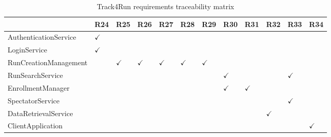 \begin{table}
\begin{adjustwidth}{-4cm}{}
\captionsetup{justification=centering}
\caption{Track4Run requirements traceability matrix}
  \label{tab:table3}
\begin{tabular}{|l||l|l|l|l|l|l|l|l|l|l|l|}
\hline
\cellcolor[HTML]{EFEFEF}                      & \cellcolor[HTML]{EFEFEF} R24 & \cellcolor[HTML]{EFEFEF} R25 & \cellcolor[HTML]{EFEFEF} R26 & \cellcolor[HTML]{EFEFEF} R27 & \cellcolor[HTML]{EFEFEF} R28 & \cellcolor[HTML]{EFEFEF} R29 & \cellcolor[HTML]{EFEFEF} R30 & \cellcolor[HTML]{EFEFEF} R31 & \cellcolor[HTML]{EFEFEF} R32 & \cellcolor[HTML]{EFEFEF} R33 & \cellcolor[HTML]{EFEFEF} R34\\ \hline \hline
\cellcolor[HTML]{EFEFEF} AuthenticationService & $\checkmark$  &   &  &    &   &   &   &    &   &   &   \\ \hline
\cellcolor[HTML]{EFEFEF}LoginService     &  $\checkmark$  &    &    &   &    &    &    &    &   &   &  \\ \hline
\cellcolor[HTML]{EFEFEF}RunCreationManagement         &    & $\checkmark$   &  $\checkmark$  &  $\checkmark$  & $\checkmark$  &  $\checkmark$  &    &    &   &   & \\ \hline
\cellcolor[HTML]{EFEFEF} RunSearchService    &    &    &    &    &    &    &  $\checkmark$ &   &  & $\checkmark$ & \\ \hline
\cellcolor[HTML]{EFEFEF} EnrollmentManager  &    &    &    &    &    &    & $\checkmark$   &  $\checkmark$  &   &   & \\ \hline
\cellcolor[HTML]{EFEFEF} SpectatorService  &    &    &    &    &   &    &    &    &   &  $\checkmark$ & \\ \hline
\cellcolor[HTML]{EFEFEF} DataRetrievalService  &    &    &    &    &    &    &    &    &  $\checkmark$   &   &  \\ \hline
\cellcolor[HTML]{EFEFEF} ClientApplication  &    &    &    &    &    &    &    &    &     &   & $\checkmark$ \\ \hline
\end{tabular}
\end{adjustwidth}
\end{table}